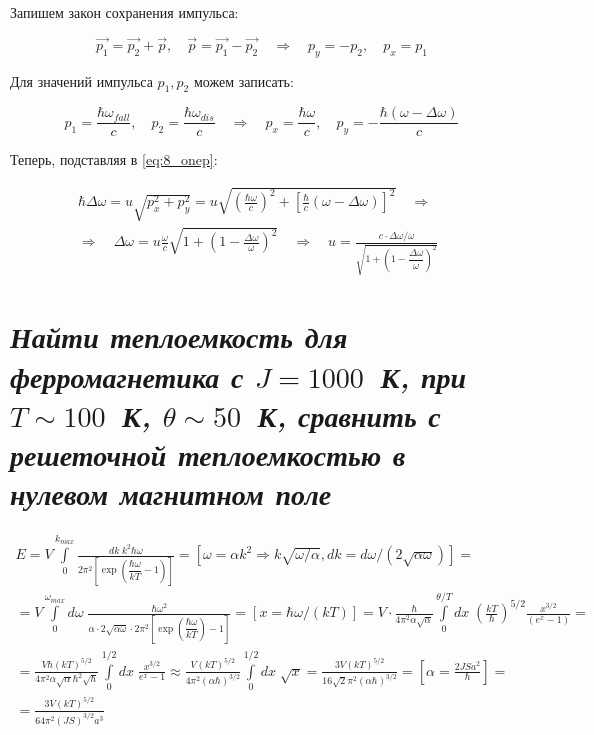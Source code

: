 \documentclass[a4paper, 12pt]{article}
\newcommand{\qrq}
{\ensuremath{\quad \Rightarrow \quad}} %
\begin{document}
Запишем закон сохранения импульса:

\begin{equation}
	\vec{p_1} = \vec{p_2} + \vec{p}, \quad \vec{p} = \vec{p_1} - \vec{p_2} \qrq p_y = -p_2, \quad p_x = p_1
\end{equation}

Для значений импульса $p_1, p_2$ можем записать:

\begin{equation}
	p_1 = \frac{\hbar \omega_{fall}}{c}, \quad p_2 = \frac{\hbar \omega_{dis}}{c} \qrq p_x = \frac{\hbar \omega}{c}, \quad p_y = -\frac{\hbar (\omega - \Delta \omega)}{c}
\end{equation}

Теперь, подставляя в \ref{eq:8_onep}:

\begin{align*}
	\hbar\Delta \omega = u \sqrt{p_x^2 + p_y^2} = u \sqrt{\left(\frac{\hbar\omega}{c}\right)^2 + \left[\frac{\hbar}{c}(\omega - \Delta \omega)\right]^2} \qrq \\
	\Rightarrow \quad \Delta \omega = u \frac{\omega}{c} \sqrt{1 + \left(1 - \frac{\Delta\omega}{\omega}\right)^2} \qrq u = \frac{c \cdot \Delta\omega / \omega}{\sqrt{1 + \left(1 - \dfrac{\Delta\omega}{\omega}\right)^2}}
\end{align*}

\newpage

\section{\textit{Найти теплоемкость для ферромагнетика с $J = 1000$~К, при $T\sim100$~К, $\theta \sim 50$~К, сравнить с решеточной теплоемкостью в нулевом магнитном поле}}

\begin{align*}
	E = V \int\limits_0^{k_{max}} \frac{d k \; k^2 \hbar \omega}{2\pi^2 \left[\exp\left(\dfrac{\hbar\omega}{k T} - 1\right)\right]} = [\omega = \alpha k^2 \Rightarrow k \sqrt{\omega/\alpha}, dk = d\omega / (2\sqrt{\alpha\omega})] = \\
	= V\int\limits_0^{\omega_{max}} d\omega\;  \frac{\hbar \omega^2}{\alpha \cdot 2\sqrt{\alpha \omega}\cdot 2\pi^2 \left[\exp\left(\dfrac{\hbar\omega}{k T}\right) - 1\right]} = [x = \hbar\omega / (k T)] = V \cdot \frac{\hbar}{4 \pi^2 \alpha\sqrt{\alpha}} \int\limits_0^{\theta/T} dx \; \left(\frac{k T}{\hbar}\right)^{5/2} \frac{x^{3/2}}{(e^x - 1)} = \\
	= \frac{V \hbar (k T)^{5/2}}{4 \pi^2 \alpha\sqrt{\alpha} \hbar^2 \sqrt{\hbar}} \int\limits_0^{1/2} dx \; \frac{x^{3/2}}{e^x - 1} \approx \frac{V (k T)^{5/2}}{4 \pi^2 (\alpha \hbar)^{3/2}} \int\limits_0^{1/2} dx \; \sqrt{x} = \frac{3 V (k T)^{5/2}}{16\sqrt{2} \pi^2 (\alpha \hbar)^{3/2}} = [\alpha = \frac{2 J S a^2}{\hbar}] = \\
	 = \frac{3 V(k T)^{5/2}}{64 \pi^2 (J S)^{3/2} a^3}
\end{align*}
\end{document}
